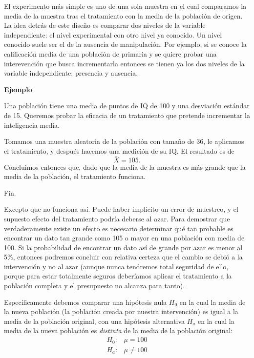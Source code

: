 \documentclass[a4paper,12pt]{article}
\begin{document}
El experimento más simple es uno de una sola muestra en el cual comparamos la media de la muestra tras el tratamiento con la media de la población de origen.
La idea detrás de este diseño es comparar dos niveles de la variable independiente: el nivel experimental con otro nivel ya conocido. Un nivel conocido suele ser el de la ausencia de manipulación. Por ejemplo, si se conoce la calificación media de una población de primaria y se quiere probar una interevención que busca incrementarla entonces se tienen ya los dos niveles de la variable independiente: presencia y ausencia.

{\noindent\bfseries Ejemplo}

Una población tiene una media de puntos de IQ de 100 y una desviación estándar de 15. Queremos probar la eficacia de un tratamiento que pretende incrementar la inteligencia media.

Tomamos una muestra aleatoria de la población con tamaño de 36, le aplicamos el tratamiento, y después hacemos una medición de su IQ. El resultado es de
\[
  \bar{X} = 105
.\]
Concluimos entonces que, dado que la media de la muestra es más grande que la media de la población, el tratamiento funciona.

Fin.

\newpage

Excepto que no funciona así. Puede haber implícito un error de muestreo, y el supuesto efecto del tratamiento podría deberse al azar. Para demostrar que verdaderamente existe un efecto es necesario determinar qué tan probable es encontrar un dato tan grande como 105 o mayor en una población con  media de 100. Si la probabilidad de encontrar un dato así de grande por azar es menor al 5\%, entonces podremos concluir con relativa certeza que el cambio se debió a la intervención y no al azar (aunque nunca tendremos total seguridad de ello, porque para estar totalmente seguros deberíamos aplicar el tratamiento a la población completa y el presupuesto no alcanza para tanto).

Específicamente debemos comparar una  hipótesis nula $H_{0}$ en la cual la media de la nueva población (la población creada por nuestra intervención) es igual a la media de la población original, con una hipótesis alternativa $H_{a}$ en la cual la media de la nueva población es {\slshape distinta} de la media de la población original:
\begin{eqnarray*}
  H_{0}: & \mu = 100\\
  H_{a}: & \mu \neq 100
\end{eqnarray*}
\end{document}
